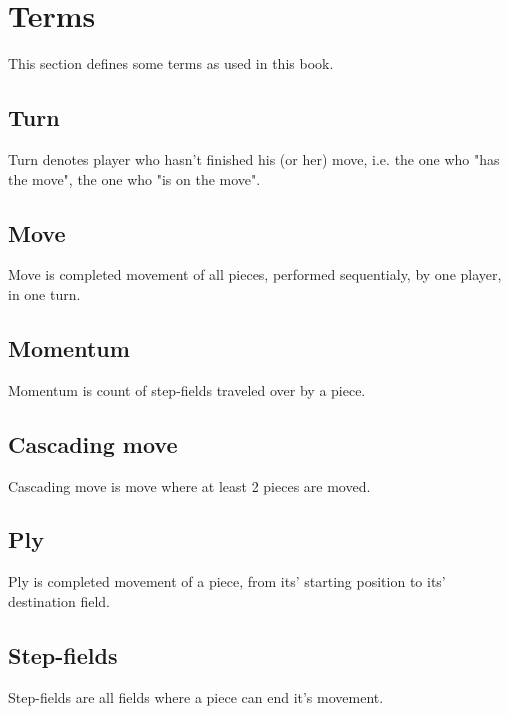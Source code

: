 
\chapter*{Terms}
\label{ch:Terms}
This section defines some terms as used in this book.

\section*{Turn}
\label{sec:Terms/Turn}
Turn denotes player who hasn't finished his (or her) move, i.e. the one who "has the move",
the one who "is on the move".

\section*{Move}
\label{sec:Terms/Move}
Move is completed movement of all pieces, performed sequentialy, by one player, in one turn.

\section*{Momentum}
\label{sec:Terms/Momentum}
Momentum is count of step-fields traveled over by a piece.

\section*{Cascading move}
\label{sec:Terms/Cascading move}
Cascading move is move where at least 2 pieces are moved.

\section*{Ply}
\label{sec:Terms/Ply}
Ply is completed movement of a piece, from its' starting position to its' destination field.

\section*{Step-fields}
\label{sec:Terms/Step-fields}
Step-fields are all fields where a piece can end it's movement.

